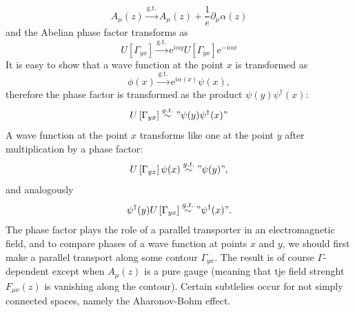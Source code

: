 \begin{equation}
  A_\mu(z)\xrightarrow{\text{g.t.}} A_\mu(z)+ \frac{1}{e}\partial_\mu\alpha(z)
\end{equation}
and the Abelian phase factor transforms as 
\begin{equation}
  U\left[\Gamma_{yx}\right]\xrightarrow{\text{g.t.}}
  \mathrm{e}^{i\alpha{y}}  U\left[\Gamma_{yx}\right]
  \mathrm{e}^{-i\alpha{x}}
\end{equation}
It is easy to show that a wave function at the point $x$ is transformed as
\begin{equation}
  \phi(x)\xrightarrow{\text{g.t.}}\mathrm{e}^{i\alpha(x)}\psi(x),
\end{equation}
therefore the phase factor is transformed as the product
$\psi(y)\psi^\dagger(x)$:
\begin{equation}
  U\left[\Gamma_{yx}\right]\stackrel{g.t.}{\sim} "\psi(y)\psi^\dagger(x)"
\end{equation}
  A wave function at the point $x$ transforms like one at the point $y$ after
  multiplication by a phase factor:
\begin{equation}
    U\left[\Gamma_{yx}\right]\psi(x)\stackrel{g.t.}{\sim} "\psi(y)",
\end{equation}
and analogously
\begin{equation}
  \psi^\dagger(y) U\left[\Gamma_{yx}\right] \stackrel{g.t.}{\sim}
  "\psi^\dagger(x)".
\end{equation}
The phase factor plays the role of a parallel transporter in an electromagnetic
field, and to compare phases of a wave function at points $x$ and $y$, we
should first make a parallel transport along some contour $\Gamma_{yx}$. The
result is of course $\Gamma$-dependent except when $A_\mu(z)$ is a pure gauge
(meaning that tje field strenght $F_{\mu\nu}(z)$ is vanishing along the
contour). Certain subtlelies occur for not simply connected spaces, namely the
Aharonov-Bohm effect. 

